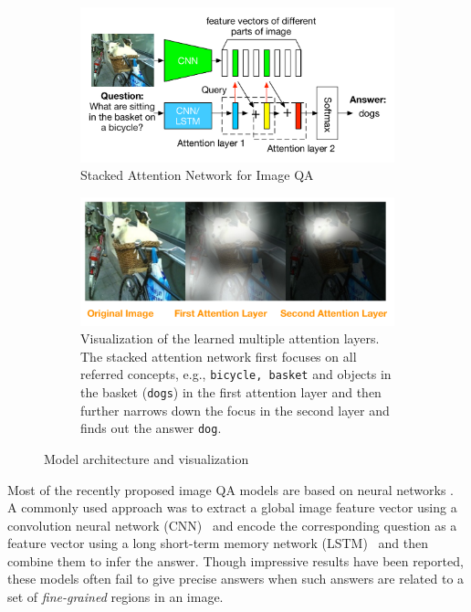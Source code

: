 \documentclass[10pt,twocolumn,letterpaper]{article}
\begin{document}
\begin{figure}[tbh]
  \centering
  \begin{subfigure}[t]{1.0\linewidth}
    \includegraphics[width=1.1\linewidth]{vqa_attention.pdf}
    \centering
    \caption{Stacked Attention Network for Image QA}
    \label{fig:vqa_attention}
  \end{subfigure}

  \begin{subfigure}[t]{1.0\linewidth}
    \includegraphics[width=\linewidth]{working_example_dog.pdf}
    \centering
    \caption{Visualization of the learned multiple attention layers. The
      stacked attention network first focuses on all referred concepts, e.g.,
      \texttt{bicycle, basket} and objects in the basket (\texttt{dogs}) in the
      first attention layer and then further narrows down the focus in the
      second layer and finds out the answer \texttt{dog}.}
    \label{fig:example}
  \end{subfigure}
  \caption{Model architecture and visualization}
  \label{fig:model_example}
 \vspace{-0.5cm}
\end{figure}

Most of the recently proposed image QA models are based on neural networks
\cite{gao2015you, ren2015imageqa, malinowski2014multi, antol2015vqa,
  malinowski2015ask}. A commonly used approach was to extract a global image
feature vector using a convolution neural network
(CNN)~\cite{lecun1998gradient} and encode the corresponding question as a
feature vector using a long short-term memory network
(LSTM)~\cite{hochreiter1997long} and then combine them to infer the
answer. Though impressive results have been reported, these models often fail
to give precise answers when such answers are related to a set of
\emph{fine-grained} regions in an image.
\end{document}

